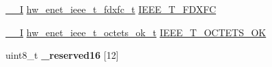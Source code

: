 \begin{DoxyCompactItemize}
\item 
\hyperlink{core__sc300_8h_af63697ed9952cc71e1225efe205f6cd3}{\+\_\+\+\_\+I} \hyperlink{union__hw__enet__ieee__t__fdxfc}{hw\+\_\+enet\+\_\+ieee\+\_\+t\+\_\+fdxfc\+\_\+t} \hyperlink{struct__hw__enet_aef8c5cd00a7804762704b9fb135f5e46}{I\+E\+E\+E\+\_\+\+T\+\_\+\+F\+D\+X\+FC}
\item 
\hyperlink{core__sc300_8h_af63697ed9952cc71e1225efe205f6cd3}{\+\_\+\+\_\+I} \hyperlink{union__hw__enet__ieee__t__octets__ok}{hw\+\_\+enet\+\_\+ieee\+\_\+t\+\_\+octets\+\_\+ok\+\_\+t} \hyperlink{struct__hw__enet_aa341a0a7ca6f7823fec468a3a649d76b}{I\+E\+E\+E\+\_\+\+T\+\_\+\+O\+C\+T\+E\+T\+S\+\_\+\+OK}
\item 
uint8\+\_\+t {\bfseries \+\_\+reserved16} \mbox{[}12\mbox{]}\hypertarget{struct__hw__enet_ab8474f0271f39e298559855a12bcc932}{}\label{struct__hw__enet_ab8474f0271f39e298559855a12bcc932}


\end{DoxyCompactItemize}
